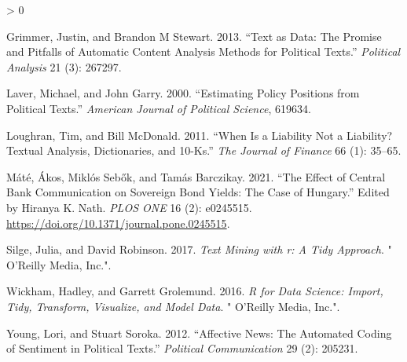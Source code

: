 \documentclass[
]{book}
\newlength{\cslhangindent}
\newenvironment{CSLReferences}[2] %
 {%
  \setlength{\parindent}{0pt}
  \ifodd #1 \everypar{\setlength{\hangindent}{\cslhangindent}}\ignorespaces\fi
  \ifnum #2 > 0
  \setlength{\parskip}{#2\baselineskip}
  \fi
 }%
 {}
\begin{document}
\hypertarget{refs}{}
\begin{CSLReferences}{1}{0}
\leavevmode\hypertarget{ref-grimmer2013text}{}%
Grimmer, Justin, and Brandon M Stewart. 2013. {``Text as Data: The
Promise and Pitfalls of Automatic Content Analysis Methods for Political
Texts.''} \emph{Political Analysis} 21 (3): 267297.

\leavevmode\hypertarget{ref-laver2000estimating}{}%
Laver, Michael, and John Garry. 2000. {``Estimating Policy Positions
from Political Texts.''} \emph{American Journal of Political Science},
619634.

\leavevmode\hypertarget{ref-loughran2011}{}%
Loughran, Tim, and Bill McDonald. 2011. {``When Is a Liability Not a
Liability? Textual Analysis, Dictionaries, and 10-Ks.''} \emph{The
Journal of Finance} 66 (1): 35--65.

\leavevmode\hypertarget{ref-muxe1tuxe92021}{}%
Máté, Ákos, Miklós Sebők, and Tamás Barczikay. 2021. {``The Effect of
Central Bank Communication on Sovereign Bond Yields: The Case of
Hungary.''} Edited by Hiranya K. Nath. \emph{PLOS ONE} 16 (2): e0245515.
\url{https://doi.org/10.1371/journal.pone.0245515}.

\leavevmode\hypertarget{ref-silge2017text}{}%
Silge, Julia, and David Robinson. 2017. \emph{Text Mining with r: A Tidy
Approach}. {"} O'Reilly Media, Inc.{"}.

\leavevmode\hypertarget{ref-wickham2016r}{}%
Wickham, Hadley, and Garrett Grolemund. 2016. \emph{R for Data Science:
Import, Tidy, Transform, Visualize, and Model Data}. {"} O'Reilly Media,
Inc.{"}.

\leavevmode\hypertarget{ref-young2012affective}{}%
Young, Lori, and Stuart Soroka. 2012. {``Affective News: The Automated
Coding of Sentiment in Political Texts.''} \emph{Political
Communication} 29 (2): 205231.

\end{CSLReferences}

\backmatter
\end{document}
